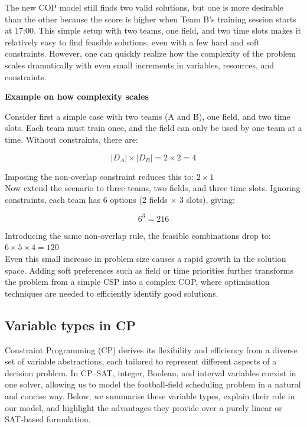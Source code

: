 \documentclass[12pt]{article}
\begin{document}
\vspace{1.5em}
\noindent
The new COP model still finds two valid solutions, but one is more desirable than the other because the score is higher when Team B’s training session starts at 17:00. This simple setup with two teams, one field, and two time slots makes it relatively easy to find feasible solutions, even with a few hard and soft constraints. However, one can quickly realize how the complexity of the problem scales dramatically with even small increments in variables, resources, and constraints.

\vspace{1em}
\noindent
\textbf{Example on how complexity scales}

Consider first a simple case with two teams (A and B), one field, and two time slots. Each team must train once, and the field can only be used by one team at a time. Without constraints, there are:

\begin{equation}
|D_A| \times |D_B| = 2 \times 2 = 4
\end{equation}

Imposing the non-overlap constraint reduces this to: $2\times 1$
\\

Now extend the scenario to three teams, two fields, and three time slots. Ignoring constraints, each team has 6 options (2 fields × 3 slots), giving:

\begin{equation}
6^3 = 216
\end{equation}

Introducing the same non-overlap rule, the feasible combinations drop to: $6 \times 5 \times 4 = 120$
\\

Even this small increase in problem size causes a rapid growth in the solution space. Adding soft preferences such as field or time priorities further transforms the problem from a simple CSP into a complex COP, where optimisation techniques are needed to efficiently identify good solutions.




\subsection{Variable types in CP}

Constraint Programming (CP) derives its flexibility and efficiency from a diverse set of variable abstractions, each tailored to represent different aspects of a decision problem. In CP–SAT, integer, Boolean, and interval variables coexist in one solver, allowing us to model the football‐field scheduling problem in a natural and concise way. Below, we summarise these variable types, explain their role in our model, and highlight the advantages they provide over a purely linear or SAT‐based formulation.
\end{document}
